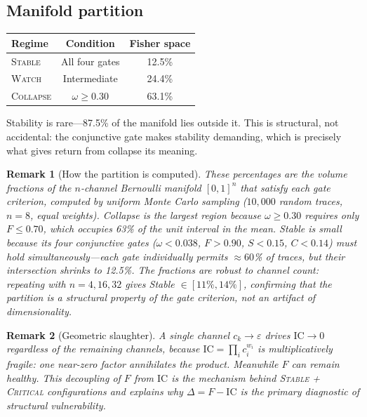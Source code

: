 \documentclass[
  aps,
  prd,
  twocolumn,
  superscriptaddress,
  nofootinbib,
  floatfix
]{revtex4-2}
\newtheorem{remark}{Remark}
\newcommand{\eps}{\varepsilon}
\newcommand{\regime}[1]{\textrm{\scshape#1}}
\newcommand{\IC}{\mathrm{IC}}
\begin{document}
\subsection{Manifold partition}

\begin{center}
\begin{tabular}{@{}lcc@{}}
\toprule
Regime & Condition & Fisher space \\
\midrule
\regime{Stable} & All four gates & 12.5\% \\
\regime{Watch} & Intermediate & 24.4\% \\
\regime{Collapse} & $\omega \geq 0.30$ & 63.1\% \\
\bottomrule
\end{tabular}
\end{center}

Stability is rare---87.5\% of the manifold lies outside it.  This
is structural, not accidental: the conjunctive gate makes stability
demanding, which is precisely what gives return from collapse its
meaning.

\begin{remark}[How the partition is computed]
These percentages are the volume fractions of the $n$-channel
Bernoulli manifold $[0,1]^n$ that satisfy each gate criterion,
computed by uniform Monte Carlo sampling ($10{,}000$ random
traces, $n = 8$, equal weights).
Collapse is the largest region because $\omega \geq 0.30$ requires
only $F \leq 0.70$, which occupies 63\% of the unit interval in
the mean.  Stable is small because its four conjunctive gates
($\omega < 0.038$, $F > 0.90$, $S < 0.15$, $C < 0.14$) must
hold \emph{simultaneously}---each gate individually permits
$\approx 60$\% of traces, but their intersection shrinks to
12.5\%.  The fractions are robust to channel count: repeating
with $n = 4, 16, 32$ gives Stable $\in [11\%, 14\%]$, confirming
that the partition is a structural property of the gate criterion,
not an artifact of dimensionality.
\end{remark}

\begin{remark}[Geometric slaughter]
A single channel $c_k \to \eps$ drives $\IC \to 0$ regardless of
the remaining channels, because $\IC = \prod_i c_i^{w_i}$ is
multiplicatively fragile: one near-zero factor annihilates the
product.  Meanwhile $F$ can remain healthy.  This decoupling of $F$
from $\IC$ is the mechanism behind \regime{Stable} +
\regime{Critical} configurations and explains why $\Delta = F - \IC$
is the primary diagnostic of structural vulnerability.
\end{remark}
\end{document}
